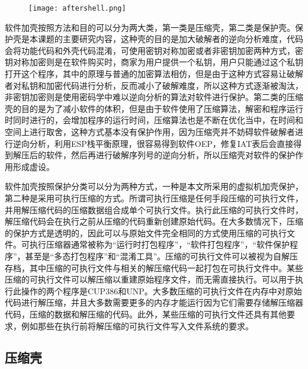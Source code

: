 \begin{figure}[htbp]
	\centering
	\texttt{[image: aftershell.png]}\\
	\label{sec2:subsec3:aftershell}
\end{figure}

软件加壳按照方法和目的可以分为两大类，第一类是压缩壳，第二类是保护壳。保护壳是本课题的主要研究内容，这种壳的目的是加大破解者的逆向分析难度，代码会将功能代码和外壳代码混淆，可使用密钥对称加密或者非密钥加密两种方式，密钥对称加密则是在软件购买时，商家为用户提供一个私钥，用户只能通过这个私钥打开这个程序，其中的原理与普通的加密算法相仿，但是由于这种方式容易让破解者对私钥和加密代码进行分析，反而减小了破解难度，所以这种方式逐渐被淘汰，非密钥加密则是使用密码学中难以逆向分析的算法对软件进行保护。第二类的压缩壳的目的是为了减小软件的体积，但是由于软件使用了压缩算法，解密和程序运行时同时进行的，会增加程序的运行时间，压缩算法也是不断在优化当中，在时间和空间上进行取舍，这种方式基本没有保护作用，因为压缩壳并不妨碍软件破解者进行逆向分析，利用ESP栈平衡原理，很容易得到软件OEP，修复IAT表后会直接得到解压后的软件，然后再进行破解序列号的逆向分析，所以压缩壳对软件的保护作用形成虚设。

软件加壳按照保护分类可以分为两种方式，一种是本文所采用的虚拟机加壳保护，第二种是采用可执行压缩的方式。所谓可执行压缩是任何手段压缩的可执行文件，并用解压缩代码的压缩数据组合成单个可执行文件。执行此压缩的可执行文件时，解压缩代码会在执行之前从压缩的代码重新创建原始代码。在大多数情况下，压缩的保护方式是透明的，因此可以与原始文件完全相同的方式使用压缩的可执行文件。可执行压缩器通常被称为“运行时打包程序”，“软件打包程序”，“软件保护程序”，甚至是“多态打包程序”和“混淆工具”。压缩的可执行文件可以被视为自解压存档，其中压缩的可执行文件与相关的解压缩代码一起打包在可执行文件中。某些压缩的可执行文件可以解压缩以重建原始程序文件，而无需直接执行。可以用于执行此操作的两个程序是CUP386和UNP。大多数压缩的可执行文件在内存中对原始代码进行解压缩，并且大多数需要更多的内存才能运行因为它们需要存储解压缩器代码，压缩的数据和解压缩的代码。此外，某些压缩的可执行文件还具有其他要求，例如那些在执行前将解压缩的可执行文件写入文件系统的要求。

\subsection{压缩壳}
\label{cha3:sec:mutualdet}

